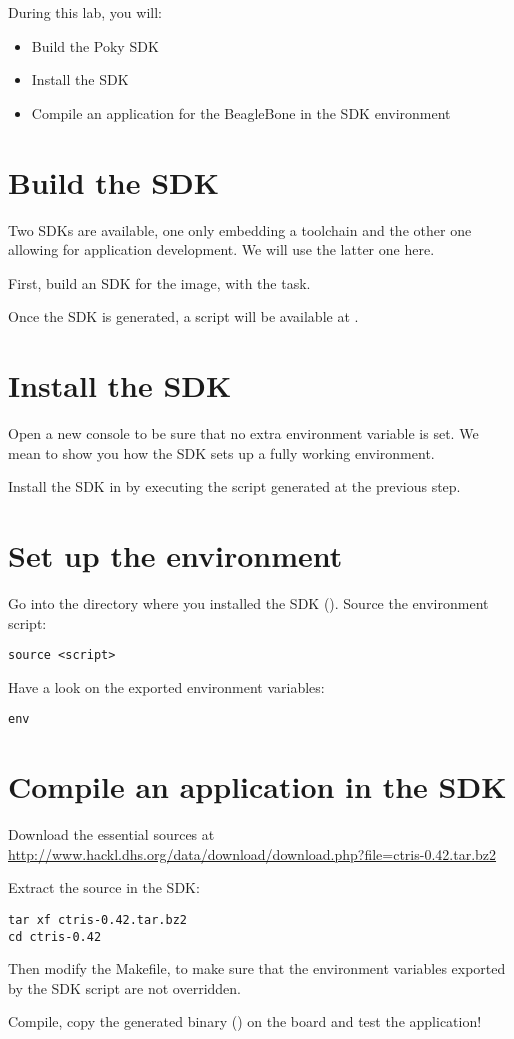 
During this lab, you will:
\begin{itemize}
  \item Build the Poky SDK
  \item Install the SDK
  \item Compile an application for the BeagleBone in the SDK
    environment
\end{itemize}

\section{Build the SDK}

Two SDKs are available, one only embedding a toolchain and the
other one allowing for application development. We will use the latter one
here.

First, build an SDK for the  image, with
the  task.

Once the SDK is generated, a script will be available at
.

\section{Install the SDK}

Open a new console to be sure that no extra environment variable is set.
We mean to show you how the SDK sets up a fully working environment.

Install the SDK in  by executing the script
generated at the previous step.

\section{Set up the environment}

Go into the directory where you installed the SDK
(). Source the environment script:
\begin{verbatim}
source <script>
\end{verbatim}

Have a look on the exported environment variables:
\begin{verbatim}
env
\end{verbatim}

\section{Compile an application in the SDK}

Download the essential  sources at
\url{http://www.hackl.dhs.org/data/download/download.php?file=ctris-0.42.tar.bz2}

Extract the source in the SDK:
\begin{verbatim}
tar xf ctris-0.42.tar.bz2
cd ctris-0.42
\end{verbatim}

Then modify the Makefile, to make sure that the environment variables exported
by the SDK script are not overridden.

Compile, copy the generated binary () on the board and
test the application!
